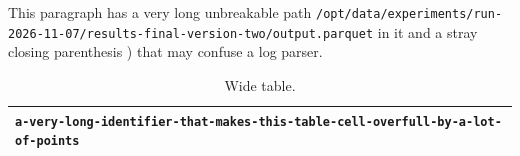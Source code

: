 This paragraph has a very long unbreakable path \texttt{/opt/data/experiments/run-2026-11-07/results-final-version-two/output.parquet} in it and a stray closing parenthesis ) that may confuse a log parser.

\begin{table}[h]
\begin{tabular}{l}
\toprule
\texttt{a-very-long-identifier-that-makes-this-table-cell-overfull-by-a-lot-of-points} \\
\bottomrule
\end{tabular}
\caption{Wide table.}
\end{table}
